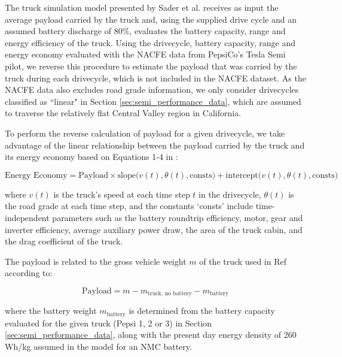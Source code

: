The truck simulation model presented by Sader et al. \cite{Sader_2023} receives as input the average payload carried by the truck and, using the supplied drive cycle and an assumed battery discharge of 80\%, evaluates the battery capacity, range and energy efficiency of the truck. Using the drivecycle, battery capacity, range and energy economy evaluated with the NACFE data from PepsiCo's Tesla Semi pilot, we reverse this procedure to estimate the payload that was carried by the truck during each drivecycle, which is not included in the NACFE dataset. As the NACFE data also excludes road grade information, we only consider drivecycles classified as ``linear" in Section \ref{sec:semi_performance_data}, which are assumed to traverse the relatively flat Central Valley region in California.


To perform the reverse calculation of payload for a given drivecycle, we take advantage of the linear relationship between the payload carried by the truck and its energy economy based on Equations 1-4 in \cite{Sader_2023}:

\begin{equation}
    \label{eq:energy_economy}
    \text{Energy Economy} = \text{Payload}\times \text{slope}\big(v(t), \theta(t), \text{consts}\big) + \text{intercept}\big(v(t), \theta(t), \text{consts}\big)
\end{equation}

\noindent where $v(t)$ is the truck's speed at each time step $t$ in the drivecycle, $\theta(t)$ is the road grade at each time step, and the constants `consts' include time-independent parameters such as the battery roundtrip efficiency, motor, gear and inverter efficiency, average auxiliary power draw, the area of the truck cabin, and the drag coefficient of the truck. 

The payload is related to the gross vehicle weight $m$ of the truck used in Ref \cite{Sader_2023} according to:

\begin{equation}
    \label{eq:payload}
    \text{Payload} = m - m_\text{truck, no battery} - m_\text{battery}
\end{equation}

\noindent where the battery weight $m_\text{battery}$ is determined from the battery capacity evaluated for the given truck (Pepsi 1, 2 or 3) in Section \ref{sec:semi_performance_data}, along with the present day energy density of 260 Wh/kg assumed in the model for an NMC battery.

